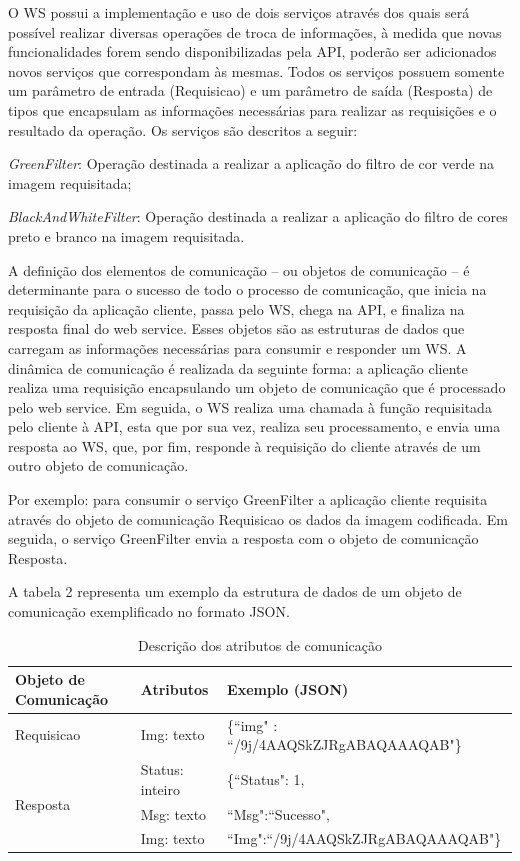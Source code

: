 \documentclass[12pt]{article}
\begin{document}
O WS possui a implementação e uso de dois serviços através dos quais será possível realizar diversas operações de troca de informações, à medida que novas funcionalidades forem sendo disponibilizadas pela API, poderão ser adicionados novos serviços que correspondam às mesmas.
Todos os serviços possuem somente um parâmetro de entrada (Requisicao) e um parâmetro de saída (Resposta) de tipos que encapsulam as informações necessárias para realizar as requisições e o resultado da operação. Os serviços são descritos a seguir:


\textit{GreenFilter}: Operação destinada a realizar a aplicação do filtro de cor verde na imagem requisitada;

\textit{BlackAndWhiteFilter}: Operação destinada a realizar a aplicação do filtro de cores preto e branco na imagem requisitada.

A definição dos elementos de comunicação – ou objetos de comunicação – é
determinante para o sucesso de todo o processo de comunicação, que inicia na requisição da aplicação cliente, passa pelo WS, chega na API, e finaliza na resposta final do web service. Esses objetos são as estruturas de dados que carregam as informações necessárias para consumir e responder um WS.
A dinâmica de comunicação é realizada da seguinte forma: a aplicação cliente realiza uma requisição encapsulando um objeto de comunicação que é processado pelo web service. Em seguida, o WS realiza uma chamada à função requisitada pelo cliente à API, esta que por sua vez, realiza seu processamento, e envia uma resposta ao WS, que, por fim, responde à requisição do cliente através de um outro objeto de comunicação.

Por exemplo: para consumir o serviço GreenFilter a aplicação cliente requisita através do objeto de comunicação Requisicao os dados da imagem codificada. Em seguida, o serviço GreenFilter envia a resposta com o objeto de comunicação Resposta.

A tabela 2 representa um exemplo da estrutura de dados de um objeto de
comunicação exemplificado no formato JSON.

\begin{table}[ht]
	\centering
	\caption{Descrição dos atributos de comunicação}
	\label{tab:Table2}
	\smallskip
	\begin{tabular}{ |l|l|l| }
		\hline
		Objeto de Comunicação & Atributos & Exemplo (JSON) \\ \hline
		Requisicao & Img: texto & \{“img" : “/9j/4AAQSkZJRgABAQAAAQAB"\} \\ \hline
		\multirow{3}{*}{Resposta} & Status: inteiro & \{“Status": 1, \\
		& Msg: texto & “Msg":“Sucesso", \\
		& Img: texto & “Img":“/9j/4AAQSkZJRgABAQAAAQAB"\} \\
		\hline
	\end{tabular}
\end{table}
\end{document}
